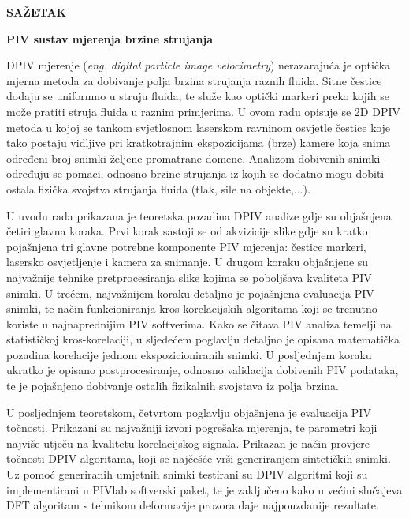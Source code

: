 \begin{flushleft}
	{\Large\bf{SAŽETAK}}
	\vskip 3mm
	{\large\bf{PIV sustav mjerenja brzine strujanja}}	
	\vskip 3mm
\end{flushleft}	
DPIV mjerenje (\textit{eng. digital particle image velocimetry}) nerazarajuća je optička mjerna metoda za dobivanje polja brzina strujanja raznih fluida. Sitne čestice dodaju se uniformno u struju fluida, te služe kao optički markeri preko kojih se može pratiti struja fluida u raznim primjerima. U ovom radu opisuje se 2D DPIV metoda u kojoj se tankom svjetlosnom laserskom ravninom osvjetle čestice koje tako postaju vidljive pri kratkotrajnim ekspozicijama (brze) kamere koja snima određeni broj snimki željene promatrane domene. Analizom dobivenih snimki određuju se pomaci, odnosno brzine strujanja iz kojih se dodatno mogu dobiti ostala fizička svojstva strujanja fluida (tlak, sile na objekte,...).
\par
U uvodu rada prikazana je teoretska pozadina DPIV analize gdje su objašnjena četiri glavna koraka. Prvi korak sastoji se od akvizicije slike gdje su kratko pojašnjena tri glavne potrebne komponente PIV mjerenja: čestice markeri, lasersko osvjetljenje i kamera za snimanje. U drugom koraku objašnjene su najvažnije tehnike pretprocesiranja slike kojima se poboljšava kvaliteta PIV snimki. U trećem, najvažnijem koraku detaljno je pojašnjena evaluacija PIV snimki, te način funkcioniranja kros-korelacijskih algoritama koji se trenutno koriste u najnaprednijim PIV softverima. Kako se čitava PIV analiza temelji na statističkoj kros-korelaciji, u sljedećem poglavlju detaljno je opisana matematička pozadina korelacije jednom ekspozicioniranih snimki. U posljednjem koraku ukratko je opisano postprocesiranje, odnosno validacija dobivenih PIV podataka, te je pojašnjeno dobivanje ostalih fizikalnih svojstava iz polja brzina.
\par
U posljednjem teoretskom, četvrtom poglavlju objašnjena je evaluacija PIV točnosti. Prikazani su najvažniji izvori pogrešaka mjerenja, te parametri koji najviše utječu na kvalitetu korelacijskog signala. Prikazan je način provjere točnosti DPIV algoritama, koji se najčešće vrši generiranjem sintetičkih snimki. Uz pomoć generiranih umjetnih snimki testirani su DPIV algoritmi koji su implementirani u PIVlab softverski paket, te je zaključeno kako u većini slučajeva DFT algoritam s tehnikom deformacije prozora daje najpouzdanije rezultate.
\par
